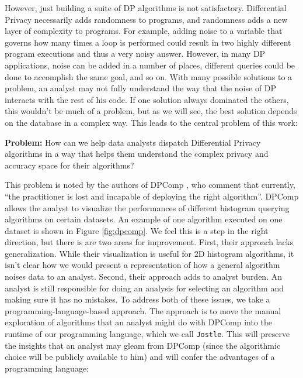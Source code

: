 \documentclass[11pt]{article}
\newcommand{\Jostle}{\texttt{Jostle}}
\begin{document}
However, just building a suite of DP algorithms is not satisfactory. Differential Privacy necessarily adds randomness to programs, and randomness adds a new layer of complexity to programs. For example, adding noise to a variable that governs how many times a loop is performed could result in two highly different program executions and thus a very noisy answer. However, in many DP applications, noise can be added in a number of places, different queries could be done to accomplish the same goal, and so on. With many possible solutions to a problem, an analyst may not fully understand the way that the noise of DP interacts with the rest of his code. If one solution always dominated the others, this wouldn't be much of a problem, but as we will see, the best solution depends on the database in a complex way. This leads to the central problem of this work: 

\textbf{Problem:} How can we help data analysts dispatch Differential Privacy algorithms in a way that helps them understand the complex privacy and accuracy space for their algorithms?

This problem is noted by the authors of DPComp \cite{Hay:2016}, who comment that currently, ``the practitioner is lost and incapable of deploying the right algorithm''. DPComp allows the analyst to visualize the performances of different histogram querying algorithms on certain datasets. An example of one algorithm executed on one dataset is shown in Figure \ref{fig:dpcomp}. We feel this is a step in the right direction, but there is are two areas for improvement. First, their approach lacks generalization. While their visualization is useful for 2D histogram algorithms, it isn't clear how we would present a representation of how a general algorithm noises data to an analyst. Second, their approach adds to analyst burden. An analyst is still responsible for doing an analysis for selecting an algorithm and making sure it has no mistakes. To address both of these issues, we take a programming-language-based approach. The approach is to move the manual exploration of algorithms that an analyst might do with DPComp into the runtime of our programming language, which we call \Jostle{}. This will preserve the insights that an analyst may gleam from DPComp (since the algorithmic choice will be publicly available to him) and will confer the advantages of a programming language:
\end{document}
